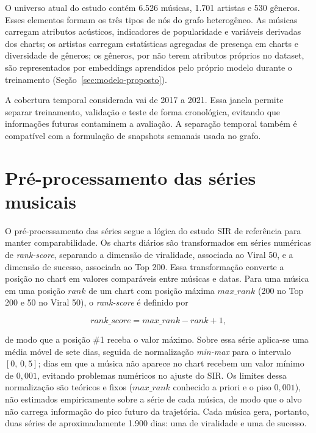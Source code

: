 O universo atual do estudo contém 6.526 músicas, 1.701 artistas e 530 gêneros. Esses elementos formam os três tipos de nós do grafo heterogêneo. As músicas carregam atributos acústicos, indicadores de popularidade e variáveis derivadas dos charts; os artistas carregam estatísticas agregadas de presença em charts e diversidade de gêneros; os gêneros, por não terem atributos próprios no dataset, são representados por embeddings aprendidos pelo próprio modelo durante o treinamento (Seção~\ref{sec:modelo-proposto}).

A cobertura temporal considerada vai de 2017 a 2021. Essa janela permite separar treinamento, validação e teste de forma cronológica, evitando que informações futuras contaminem a avaliação. A separação temporal também é compatível com a formulação de snapshots semanais usada no grafo.


\section{Pré-processamento das séries musicais}
\label{sec:preproc}

O pré-processamento das séries segue a lógica do estudo SIR de referência para manter comparabilidade. Os charts diários são transformados em séries numéricas de \emph{rank-score}, separando a dimensão de viralidade, associada ao Viral 50, e a dimensão de sucesso, associada ao Top 200. Essa transformação converte a posição no chart em valores comparáveis entre músicas e datas. Para uma música em uma posição $rank$ de um chart com posição máxima $\textit{max\_rank}$ (200 no Top 200 e 50 no Viral 50), o \emph{rank-score} é definido por

\begin{equation}
\label{eq:rank-score}
\textit{rank\_score} = \textit{max\_rank} - rank + 1,
\end{equation}

de modo que a posição \#1 receba o valor máximo. Sobre essa série aplica-se uma média móvel de sete dias, seguida de normalização \emph{min-max} para o intervalo $[0,\,0{,}5]$; dias em que a música não aparece no chart recebem um valor mínimo de $0{,}001$, evitando problemas numéricos no ajuste do SIR. Os limites dessa normalização são teóricos e fixos ($\textit{max\_rank}$ conhecido a priori e o piso $0{,}001$), não estimados empiricamente sobre a série de cada música, de modo que o alvo não carrega informação do pico futuro da trajetória. Cada música gera, portanto, duas séries de aproximadamente 1.900 dias: uma de viralidade e uma de sucesso.

